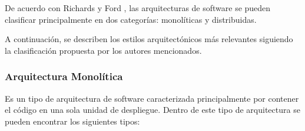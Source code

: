 De acuerdo con Richards y Ford \cite{libroArquitecturasSoftware}, las arquitecturas de software se pueden clasificar 
principalmente en dos categorías: monolíticas y distribuidas.

A continuación, se describen los estilos arquitectónicos más relevantes siguiendo la clasificación propuesta por los 
autores mencionados.

\subsubsection{Arquitectura Monolítica}

Es un tipo de arquitectura de software caracterizada principalmente por contener el código en una sola unidad de despliegue.
Dentro de este tipo de arquitectura se pueden encontrar los siguientes tipos:

